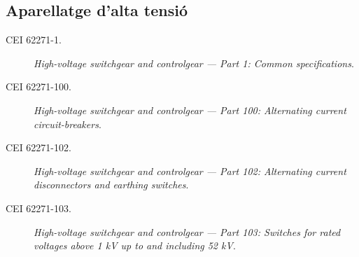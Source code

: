 \subsection*{Aparellatge d'alta tensió}
\begin{description}
    \item [\hspace{5mm}CEI 62271-1.] \textit{High-voltage switchgear and controlgear --- Part 1: Common specifications}.
    \item [\hspace{5mm}CEI 62271-100.] \textit{High-voltage switchgear and controlgear --- Part 100: Alternating current circuit-breakers}.
    \item [\hspace{5mm}CEI 62271-102.] \textit{High-voltage switchgear and controlgear --- Part 102: Alternating current disconnectors and earthing switches}.
    \item [\hspace{5mm}CEI 62271-103.] \textit{High-voltage switchgear and controlgear --- Part 103: Switches for rated voltages above 1 kV up to and including 52 kV}.
\end{description}


